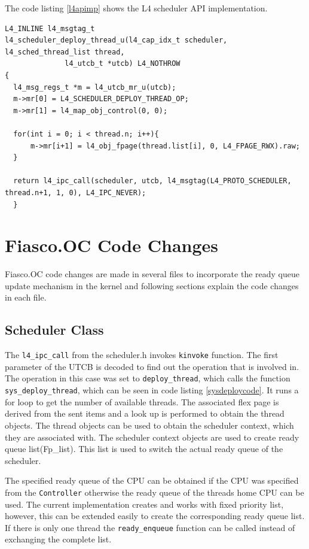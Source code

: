 The code listing \ref{l4apimp} shows the L4 scheduler API implementation.

\begin{lstlisting}[caption={L4 scheduler API implementation},label={l4apimp}, style=customcpp]
L4_INLINE l4_msgtag_t
l4_scheduler_deploy_thread_u(l4_cap_idx_t scheduler, l4_sched_thread_list thread,
			  l4_utcb_t *utcb) L4_NOTHROW
{
  l4_msg_regs_t *m = l4_utcb_mr_u(utcb);
  m->mr[0] = L4_SCHEDULER_DEPLOY_THREAD_OP;
  m->mr[1] = l4_map_obj_control(0, 0);

  for(int i = 0; i < thread.n; i++){
	  m->mr[i+1] = l4_obj_fpage(thread.list[i], 0, L4_FPAGE_RWX).raw;
  }
  
  return l4_ipc_call(scheduler, utcb, l4_msgtag(L4_PROTO_SCHEDULER, thread.n+1, 1, 0), L4_IPC_NEVER);
  }
\end{lstlisting}
  
\section{Fiasco.OC Code Changes}
Fiasco.OC code changes are made in several files to incorporate the ready queue update mechanism in the kernel and following sections explain the code changes in each file.

\subsection{Scheduler Class}

The \texttt{l4\_ipc\_call} from the scheduler.h invokes \texttt{kinvoke} function. The first parameter of the UTCB is decoded to find out the operation that is involved in. The operation in this case was set to \texttt{deploy\_thread}, which calls the function \texttt{sys\_deploy\_thread}, which can be seen in code listing \ref{sysdeploycode}. It runs a for loop to get the number of available threads. The associated flex page is derived from the sent items and a look up is performed to obtain the thread objects. The thread objects can be used to obtain the scheduler context, which they are associated with. The scheduler context objects are used to create ready queue list(Fp\_list). This list is used to switch the actual ready queue of the scheduler.

The specified ready queue of the CPU can be obtained if the CPU was specified from the \texttt{Controller} otherwise the ready queue of the threads home CPU can be used. The current implementation creates and works with fixed priority list, however, this can be extended easily to create the corresponding ready queue list. If there is only one thread the \texttt{ready\_enqueue} function can be called instead of exchanging the complete list.


